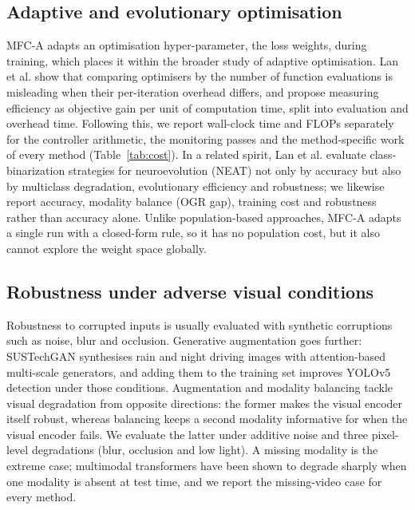 \documentclass[fleqn,10pt]{wlscirep}
\begin{document}
\subsection*{Adaptive and evolutionary optimisation}
MFC-A adapts an optimisation hyper-parameter, the loss weights, during training, which places it within the broader study of adaptive optimisation. Lan et al.\cite{lan2022time} show that comparing optimisers by the number of function evaluations is misleading when their per-iteration overhead differs, and propose measuring efficiency as objective gain per unit of computation time, split into evaluation and overhead time. Following this, we report wall-clock time and FLOPs separately for the controller arithmetic, the monitoring passes and the method-specific work of every method (Table~\ref{tab:cost}). In a related spirit, Lan et al.\cite{lan2022class} evaluate class-binarization strategies for neuroevolution (NEAT) not only by accuracy but also by multiclass degradation, evolutionary efficiency and robustness; we likewise report accuracy, modality balance (OGR gap), training cost and robustness rather than accuracy alone. Unlike population-based approaches, MFC-A adapts a single run with a closed-form rule, so it has no population cost, but it also cannot explore the weight space globally.

\subsection*{Robustness under adverse visual conditions}
Robustness to corrupted inputs is usually evaluated with synthetic corruptions such as noise, blur and occlusion\cite{hendrycks2019benchmarking}. Generative augmentation goes further: SUSTechGAN\cite{lan2025sustechgan} synthesises rain and night driving images with attention-based multi-scale generators, and adding them to the training set improves YOLOv5 detection under those conditions. Augmentation and modality balancing tackle visual degradation from opposite directions: the former makes the visual encoder itself robust, whereas balancing keeps a second modality informative for when the visual encoder fails. We evaluate the latter under additive noise and three pixel-level degradations (blur, occlusion and low light). A missing modality is the extreme case; multimodal transformers have been shown to degrade sharply when one modality is absent at test time\cite{ma2022multimodal}, and we report the missing-video case for every method.
\end{document}
